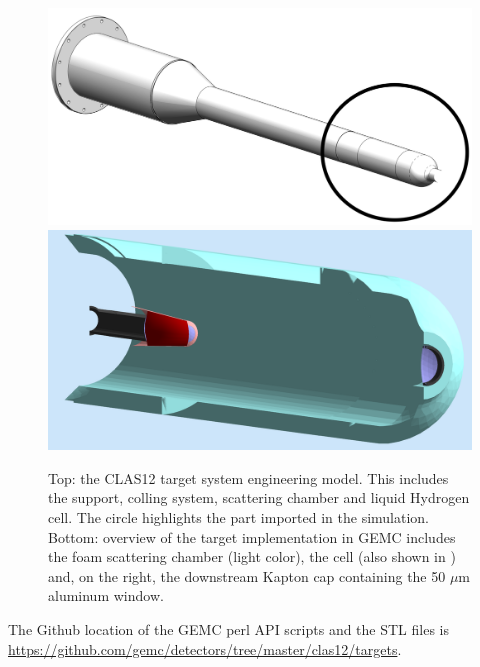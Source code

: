 \begin{figure}
	\centering
	\includegraphics[width=0.99\columnwidth,keepaspectratio]{img/targetOverview2.png}
	\includegraphics[width=0.99\columnwidth,keepaspectratio]{img/targetOverview1.png}
	\caption{Top: the CLAS12 target system engineering model. This includes the support, colling system, scattering chamber and
			 liquid Hydrogen cell. The circle highlights the part imported in the simulation.
			 Bottom: overview of the target implementation in GEMC includes the foam scattering chamber (light color), the
			 cell (also shown in ) and, on the right, the downstream Kapton cap containing the 50 $\mu$m aluminum window. }
	\label{fig:targetOverview}
\end{figure}

The Github location of the GEMC perl API scripts and the STL files is \url{https://github.com/gemc/detectors/tree/master/clas12/targets}.





